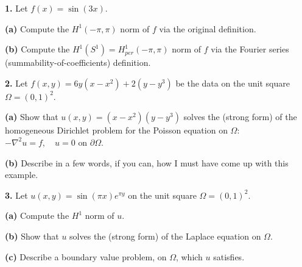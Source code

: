 \documentclass[11pt]{amsart}
\newcommand{\grad}{\nabla}
\newcommand{\prob}[1]{\bigskip\noindent\textbf{#1.}\quad }
\newcommand{\epart}[1]{\bigskip\noindent\textbf{(#1)}\quad }
\newcommand{\ds}{\displaystyle}
\begin{document}
\begin{center}
  \large
  \normalsize
\end{center}

\bigskip
\prob{1}  Let $f(x)=\sin(3x)$.

\epart{a} Compute the $H^1(-\pi,\pi)$ norm of $f$ via the original definition.

\vspace{30mm}

\epart{b} Compute the $H^1(S^1)=H_{per}^1(-\pi,\pi)$ norm of $f$ via the Fourier series (summability-of-coefficients) definition.

\vspace{60mm}

\prob{2}  Let $f(x,y)=6y(x-x^2) + 2(y-y^3)$ be the data on the unit square $\Omega=(0,1)^2$.

\epart{a} Show that $u(x,y)=(x-x^2)(y-y^3)$ solves the (strong form) of the homogeneous Dirichlet problem for the Poisson equation on $\Omega$: \quad $\ds -\grad^2 u = f, \quad u=0 \text{ on } \partial \Omega$.

\vspace{70mm}

\epart{b} Describe in a few words, if you can, how I must have come up with this example.

\vfill

\clearpage\newpage
\prob{3}  Let $u(x,y)=\sin(\pi x) e^{\pi y}$ on the unit square $\Omega=(0,1)^2$.

\epart{a} Compute the $H^1$ norm of $u$.

\vspace{100mm}

\epart{b} Show that $u$ solves the (strong form) of the Laplace equation on $\Omega$.

\vspace{70mm}

\epart{c} Describe a boundary value problem, on $\Omega$, which $u$ satisfies.

\vfill
\end{document}

